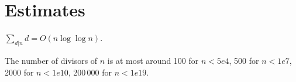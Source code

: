 
\section{Estimates}
	$\sum_{d|n} d = O(n \log \log n)$.

	The number of divisors of $n$ is at most around 100 for $n < 5e4$, 500 for $n < 1e7$, 2000 for $n < 1e10$, 200\,000 for $n < 1e19$.




